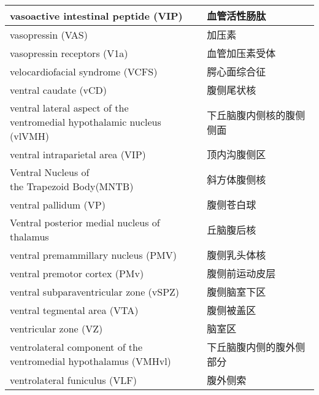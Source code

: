 \begin{longtable}{lll}
	\midrule
	vasoactive intestinal peptide (VIP)  && 血管活性肠肽  \\
	
	\midrule
	vasopressin (VAS)  && 加压素  \\
	
	\midrule
	vasopressin receptors (V1a)  && 血管加压素受体  \\
	
	\midrule
	velocardiofacial syndrome (VCFS)   && 腭心面综合征  \\
	
	\midrule
	ventral caudate (vCD)   && 腹侧尾状核  \\
	
	\midrule
	\makecell[l]{ventral lateral aspect of the \\ventromedial hypothalamic nucleus (vlVMH)}   && 下丘脑腹内侧核的腹侧侧面  \\
	
	\midrule
	ventral intraparietal area (VIP)   && 顶内沟腹侧区  \\
	
	\midrule
	\makecell[l]{Ventral Nucleus of \\the Trapezoid Body(MNTB)}   && 斜方体腹侧核  \\
	
	\midrule
	ventral pallidum (VP)  && 腹侧苍白球  \\
	
	\midrule
	Ventral posterior medial nucleus of thalamus   && 丘脑腹后核  \\
	
	\midrule
	ventral premammillary nucleus (PMV)  && 腹侧乳头体核  \\
	
	\midrule
	ventral premotor cortex (PMv)   && 腹侧前运动皮层  \\
	
	\midrule
	ventral subparaventricular zone (vSPZ)  && 腹侧脑室下区  \\
	
	\midrule
	ventral tegmental area (VTA)   && 腹侧被盖区  \\
	
	\midrule
	ventricular zone (VZ)   && 脑室区  \\
	
	\midrule
	\makecell[l]{ventrolateral component of the \\ventromedial hypothalamus (VMHvl)}  && 下丘脑腹内侧的腹外侧部分  \\
	
	\midrule
	ventrolateral funiculus (VLF)   && 腹外侧索  \\
	

\end{longtable}
